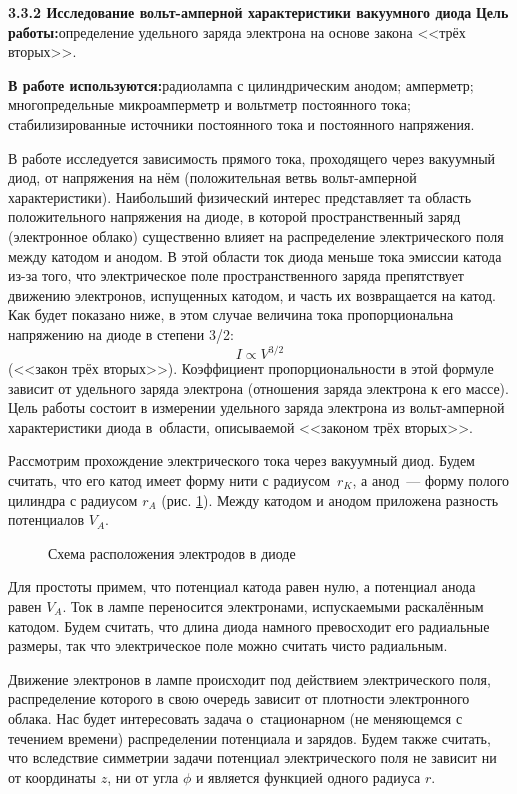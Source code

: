 {\large \bf 3.3.2 Исследование вольт-амперной характеристики вакуумного диода}
{\bf Цель работы:}{определение удельного заряда электрона на основе закона <<трёх вторых>>.}

{\bf В работе используются:}{радиолампа с цилиндрическим анодом; амперметр; многопредельные микроамперметр и вольтметр постоянного тока; стабилизированные источники постоянного тока и постоянного напряжения.}

В работе исследуется зависимость прямого тока, проходящего через вакуумный диод, от напряжения на нём (положительная ветвь вольт-амперной характеристики). Наибольший физический интерес представляет та область положительного напряжения на диоде, в которой пространственный заряд (электронное облако) существенно влияет на распределение электрического поля между катодом и анодом. В этой области ток диода меньше тока эмиссии катода из-за того, что электрическое поле пространственного заряда препятствует движению электронов, испущенных катодом, и часть их возвращается на катод. Как будет показано ниже, в этом случае величина тока пропорциональна напряжению на диоде в степени 3/2:
\begin{equation}
I\propto V^{3/2}
\end{equation}
(<<закон трёх вторых>>). Коэффициент пропорциональности в этой формуле зависит от удельного заряда электрона (отношения заряда электрона к его массе). Цель работы состоит в измерении удельного заряда электрона из вольт-амперной характеристики диода в~области, описываемой <<законом трёх вторых>>.

Рассмотрим прохождение электрического тока через вакуумный диод. Будем считать, что его катод имеет форму нити с
радиусом~$r_K$, а анод~--- форму полого цилиндра с радиусом $r_A$ (рис. \ref{fig3.2.1}). Между катодом и анодом приложена разность потенциалов $V_A$.

\begin{figure}
\caption{Схема расположения электродов в диоде}
\label{fig3.2.1}
\end{figure}

Для простоты примем, что потенциал катода равен нулю, а потенциал анода равен $V_A$. Ток в лампе переносится
электронами, испускаемыми раскалённым катодом. Будем считать, что длина диода намного превосходит его радиальные
размеры, так что электрическое поле можно считать чисто радиальным.

Движение электронов в лампе происходит под действием электрического поля, распределение которого в свою очередь зависит от плотности электронного облака. Нас будет интересовать задача о~стационарном (не меняющемся с течением времени) распределении потенциала и зарядов. Будем также считать, что вследствие симметрии задачи потенциал электрического поля не зависит ни от координаты $z$, ни от угла $\phi$ и является функцией одного радиуса $r$.

